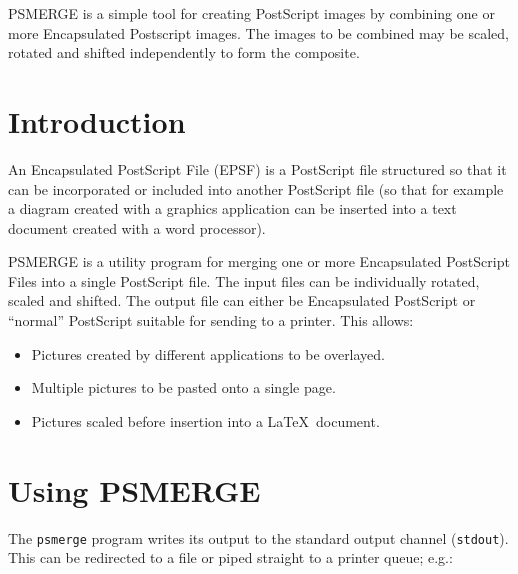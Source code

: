 \documentclass[twoside,11pt]{article}
\newcommand{\stardocinitials}  {SUN}
\newcommand{\stardocnumber}    {164.2}
\newcommand{\stardocabstract}  {PSMERGE is a simple tool for creating
PostScript images by combining one or more Encapsulated Postscript images.
The images to be combined may be scaled, rotated and shifted
independently to form the composite.}
\newcommand{\stardocname}{\stardocinitials /\stardocnumber}
\newenvironment{latexonly}{}{}
\newcommand{\xlabel}[1]{}
\newcommand{\latexonlytoc}[0]{\tableofcontents}
\renewcommand{\thepage}{\roman{page}}
\begin{document}
\stardocabstract
  \newpage
  \begin{latexonly}
    \setlength{\parskip}{0mm}
    \latexonlytoc
    \setlength{\parskip}{\medskipamount}
    \markboth{\stardocname}{\stardocname}
  \end{latexonly}
\cleardoublepage
\renewcommand{\thepage}{\arabic{page}}
\setcounter{page}{1}


\section{\xlabel{introduction}Introduction}
\label{introduction}

An Encapsulated PostScript File (EPSF) is a PostScript file structured
so that it can be incorporated or included into another PostScript file
(so that for example a diagram created with a graphics application can
be inserted into a text document created with a word processor).

PSMERGE is a utility program for merging one or more Encapsulated
PostScript Files into a single PostScript file. The input files can be
individually rotated, scaled and shifted. The output file can either be
Encapsulated PostScript or ``normal'' PostScript suitable for sending
to a printer. This allows:

\begin{itemize}
\item Pictures created by different applications to be overlayed.
\item Multiple pictures to be pasted onto a single page.
\item Pictures scaled before insertion into a \LaTeX\ document.
\end{itemize}

\section{\xlabel{using_psmerge}Using PSMERGE}
\label{using_psmerge}

The \texttt{psmerge} program writes its output to the standard output channel 
(\texttt{stdout}).  This can be redirected to a file or piped straight to a 
printer queue; e.g.:
\end{document}
